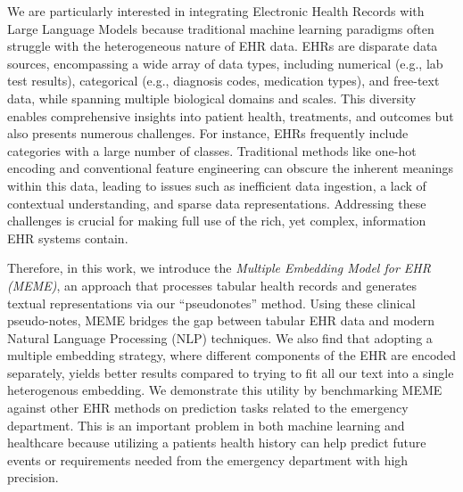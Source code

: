 \documentclass[pmlr]{jmlr}%
\begin{document}
We are particularly interested in integrating Electronic Health Records with Large Language Models because traditional machine learning paradigms often struggle with the heterogeneous nature of EHR data. EHRs are disparate data sources, encompassing a wide array of data types, including numerical (e.g., lab test results), categorical (e.g., diagnosis codes, medication types), and free-text data, while spanning multiple biological domains and scales. This diversity enables comprehensive insights into patient health, treatments, and outcomes but also presents numerous challenges. For instance, EHRs frequently include categories with a large number of classes. Traditional methods like one-hot encoding and conventional feature engineering can obscure the inherent meanings within this data, leading to issues such as inefficient data ingestion, a lack of contextual understanding, and sparse data representations. Addressing these challenges is crucial for making full use of the rich, yet complex, information EHR systems contain.

Therefore, in this work, we introduce the \textit{Multiple Embedding Model for EHR (MEME)}, an approach that processes tabular health records and generates textual representations via our ``pseudonotes'' method. Using these clinical pseudo-notes, MEME bridges the gap between tabular EHR data and modern Natural Language Processing (NLP) techniques. We also find that adopting a multiple embedding strategy, where different components of the EHR are encoded separately, yields better results compared to trying to fit all our text into a single heterogenous embedding. We demonstrate this utility by benchmarking MEME against other EHR methods on prediction tasks related to the emergency department. This is an important problem in both machine learning and healthcare because utilizing a patients health history can help predict future events or requirements needed from the emergency department with high precision.




\end{document}
